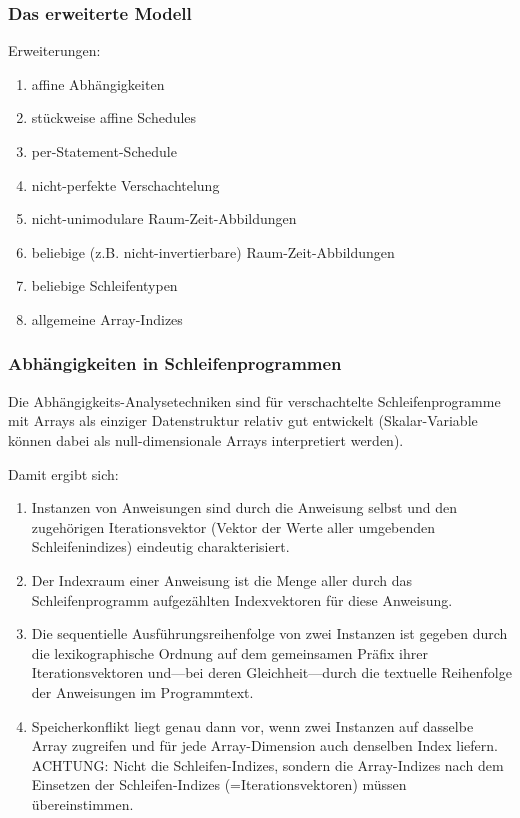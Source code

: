 \subsubsection{Das erweiterte Modell}
\label{sec:new-mod}

Erweiterungen:
\begin{enumerate}
\item affine Abhängigkeiten
\item stückweise affine Schedules
\item per-Statement-Schedule
\item nicht-perfekte Verschachtelung
\item nicht-unimodulare Raum-Zeit-Abbildungen
\item beliebige (z.B. nicht-invertierbare) Raum-Zeit-Abbildungen
\item beliebige Schleifentypen
\item allgemeine Array-Indizes
\end{enumerate}


\subsubsection{Abhängigkeiten in Schleifenprogrammen}
Die Abhängigkeits-Analysetechniken sind für verschachtelte
Schleifenprogramme mit Arrays als einziger Datenstruktur relativ gut
entwickelt (Skalar-Variable können dabei als null-dimensionale Arrays
interpretiert werden).

Damit ergibt sich:
\begin{enumerate}
\item Instanzen von Anweisungen sind durch die Anweisung selbst und den
  zugehörigen Iterationsvektor (Vektor der Werte aller umgebenden
  Schleifenindizes) eindeutig charakterisiert.
\item Der Indexraum einer Anweisung ist die Menge aller durch das
  Schleifenprogramm aufgezählten Indexvektoren für diese Anweisung.
\item Die sequentielle Ausführungsreihenfolge von zwei Instanzen ist
  gegeben durch die lexikographische Ordnung auf dem gemeinsamen Präfix
  ihrer Iterationsvektoren und---bei deren Gleichheit---durch die
  textuelle Reihenfolge der Anweisungen im Programmtext.
\item Speicherkonflikt liegt genau dann vor, wenn zwei Instanzen auf
  dasselbe Array zugreifen und für jede Array-Dimension auch denselben
  Index liefern. ACHTUNG: Nicht die Schleifen-Indizes, sondern die
  Array-Indizes nach dem Einsetzen der Schleifen-Indizes
  (=Iterationsvektoren) müssen übereinstimmen.
\end{enumerate}

